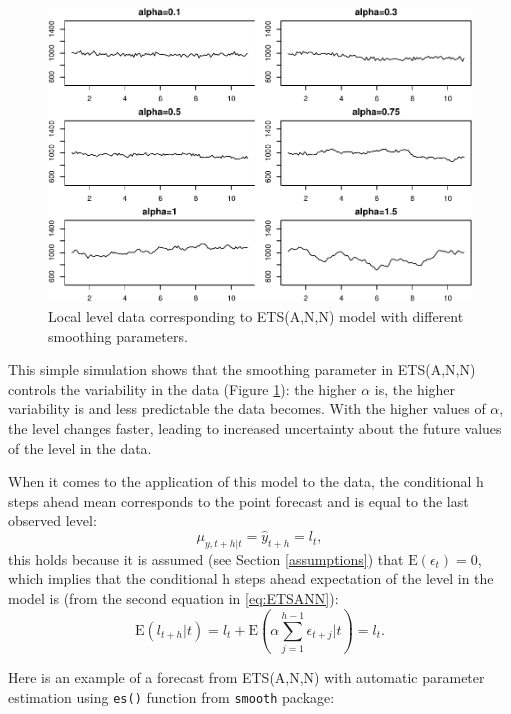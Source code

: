 \documentclass[
]{book}
\theoremstyle{definition}
\theoremstyle{definition}
\theoremstyle{definition}
\theoremstyle{definition}
\theoremstyle{remark}
\begin{document}
\begin{figure}
\centering
\includegraphics{Svetunkov--2022----ADAM_files/figure-latex/DGPetsANNExample-1.pdf}
\caption{\label{fig:DGPetsANNExample}Local level data corresponding to ETS(A,N,N) model with different smoothing parameters.}
\end{figure}

This simple simulation shows that the smoothing parameter in ETS(A,N,N) controls the variability in the data (Figure \ref{fig:DGPetsANNExample}): the higher \(\alpha\) is, the higher variability is and less predictable the data becomes. With the higher values of \(\alpha\), the level changes faster, leading to increased uncertainty about the future values of the level in the data.

When it comes to the application of this model to the data, the conditional h steps ahead mean corresponds to the point forecast and is equal to the last observed level:
\begin{equation}
    \mu_{y,t+h|t} = \hat{y}_{t+h} = l_{t} ,
  \label{eq:ETSANNForecast}
\end{equation}
this holds because it is assumed (see Section \ref{assumptions}) that \(\mathrm{E}(\epsilon_t)=0\), which implies that the conditional h steps ahead expectation of the level in the model is (from the second equation in \eqref{eq:ETSANN}):
\begin{equation}
  \mathrm{E}(l_{t+h}|t) = l_t + \mathrm{E}(\alpha\sum_{j=1}^{h-1}\epsilon_{t+j}|t) = l_t .
  \label{eq:ETSANNForecasthStepsAhead}
\end{equation}

Here is an example of a forecast from ETS(A,N,N) with automatic parameter estimation using \texttt{es()} function from \texttt{smooth} package:
\end{document}

